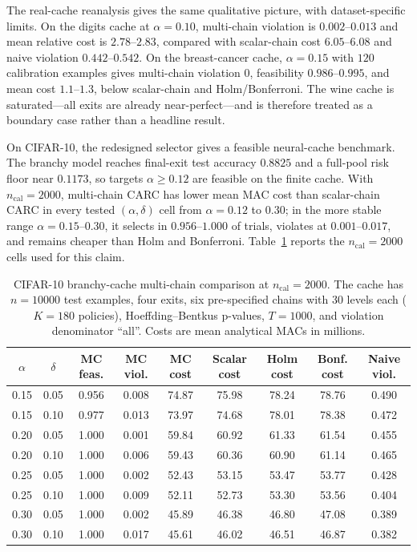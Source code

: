 \documentclass{ieeeaccess}
\begin{document}
The real-cache reanalysis gives the same qualitative picture, with dataset-specific limits. On the digits cache at $\alpha=0.10$, multi-chain violation is $0.002$--$0.013$ and mean relative cost is $2.78$--$2.83$, compared with scalar-chain cost $6.05$--$6.08$ and naive violation $0.442$--$0.542$. On the breast-cancer cache, $\alpha=0.15$ with $120$ calibration examples gives multi-chain violation $0$, feasibility $0.986$--$0.995$, and mean cost $1.1$--$1.3$, below scalar-chain and Holm/Bonferroni. The wine cache is saturated---all exits are already near-perfect---and is therefore treated as a boundary case rather than a headline result.

On CIFAR-10, the redesigned selector gives a feasible neural-cache benchmark. The branchy model reaches final-exit test accuracy $0.8825$ and a full-pool risk floor near $0.1173$, so targets $\alpha\ge0.12$ are feasible on the finite cache. With $n_{\mathrm{cal}}=2000$, multi-chain CARC has lower mean MAC cost than scalar-chain CARC in every tested $(\alpha,\delta)$ cell from $\alpha=0.12$ to $0.30$; in the more stable range $\alpha=0.15$--$0.30$, it selects in $0.956$--$1.000$ of trials, violates at $0.001$--$0.017$, and remains cheaper than Holm and Bonferroni. Table~\ref{tab:cifar10-multichain} reports the $n_{\mathrm{cal}}=2000$ cells used for this claim.

\begin{table}[t]
\centering
\caption{CIFAR-10 branchy-cache multi-chain comparison at $n_{\mathrm{cal}}=2000$. The cache has $n=10000$ test examples, four exits, six pre-specified chains with 30 levels each ($K=180$ policies), Hoeffding--Bentkus p-values, $T=1000$, and violation denominator ``all''. Costs are mean analytical MACs in millions.}
\label{tab:cifar10-multichain}
\scriptsize
\setlength{\tabcolsep}{4pt}
\begin{tabular}{@{}ccccccccc@{}}
\toprule
$\alpha$ & $\delta$ & MC feas. & MC viol. & MC cost & Scalar cost & Holm cost & Bonf. cost & Naive viol. \\
\midrule
0.15 & 0.05 & 0.956 & 0.008 & 74.87 & 75.98 & 78.24 & 78.76 & 0.490 \\
0.15 & 0.10 & 0.977 & 0.013 & 73.97 & 74.68 & 78.01 & 78.38 & 0.472 \\
0.20 & 0.05 & 1.000 & 0.001 & 59.84 & 60.92 & 61.33 & 61.54 & 0.455 \\
0.20 & 0.10 & 1.000 & 0.006 & 59.43 & 60.36 & 60.90 & 61.14 & 0.465 \\
0.25 & 0.05 & 1.000 & 0.002 & 52.43 & 53.15 & 53.47 & 53.77 & 0.428 \\
0.25 & 0.10 & 1.000 & 0.009 & 52.11 & 52.73 & 53.30 & 53.56 & 0.404 \\
0.30 & 0.05 & 1.000 & 0.002 & 45.89 & 46.38 & 46.80 & 47.08 & 0.389 \\
0.30 & 0.10 & 1.000 & 0.017 & 45.61 & 46.02 & 46.51 & 46.87 & 0.382 \\
\bottomrule
\end{tabular}
\end{table}
\end{document}
